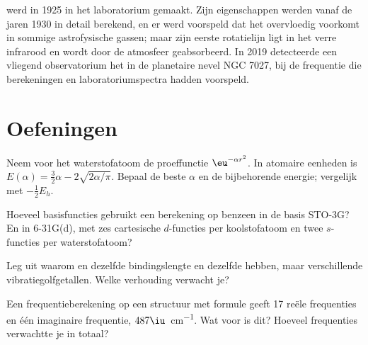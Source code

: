 \begin{history}
 werd in 1925 in het laboratorium gemaakt. Zijn eigenschappen
werden vanaf de jaren 1930 in detail berekend, en er werd voorspeld dat
het overvloedig voorkomt in sommige astrofysische gassen; maar zijn eerste
rotatielijn ligt in het verre
infrarood en wordt door de atmosfeer geabsorbeerd. In 2019 detecteerde
een vliegend observatorium het in de planetaire nevel NGC 7027, bij de
frequentie die berekeningen en laboratoriumspectra hadden voorspeld.
\end{history}

\section{Oefeningen}

\begin{exercise}[$\star$]\label{exo:b3:computational-chemistry:1}
Neem voor het waterstofatoom de proeffunctie $\eu^{-\alpha r^2}$. In atomaire
eenheden is $E(\alpha) = \frac32\alpha - 2\sqrt{2\alpha/\pi}$. Bepaal de beste
$\alpha$ en de bijbehorende energie; vergelijk met $-\frac12E_h$.
\end{exercise}

\begin{exercise}[$\star$]\label{exo:b3:computational-chemistry:2}
Hoeveel basisfuncties gebruikt een berekening op benzeen in de basis
STO-3G? En in 6-31G(d), met zes cartesische $d$-functies per koolstofatoom
en twee $s$-functies per waterstofatoom?
\end{exercise}

\begin{exercise}[$\star$]\label{exo:b3:computational-chemistry:3}
Leg uit waarom  en  dezelfde bindingslengte en dezelfde
 hebben, maar verschillende vibratiegolfgetallen. Welke
verhouding verwacht je?
\end{exercise}

\begin{exercise}[$\star$]\label{exo:b3:computational-chemistry:4}
Een frequentieberekening op een structuur met formule  geeft 17
reële frequenties en één imaginaire frequentie, $487\iu$~\unit{cm^{-1}}.
Wat voor  is dit? Hoeveel frequenties verwachtte je in
totaal?
\end{exercise}

